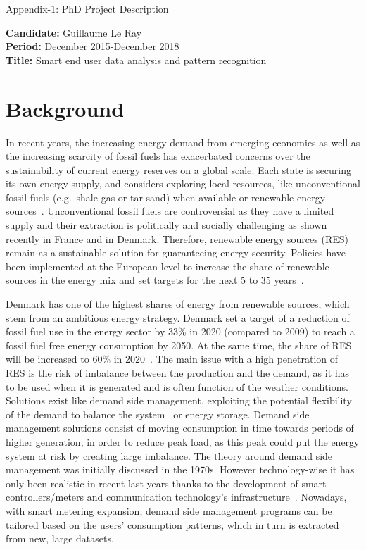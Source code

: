 \documentclass[fleqn,a4paper,twoside,10pt]{article}
\begin{document}
\begin{center}
\LARGE{Appendix-1: PhD Project Description}
\end{center}
\normalsize
\vspace{1cm}
{\bf Candidate:} Guillaume Le Ray\\
{\bf Period:} December 2015-December 2018\\
{\bf Title:} Smart end user data analysis and pattern recognition
\section{Background}
	In recent years, the increasing energy demand from emerging economies as well as the increasing scarcity of fossil fuels has exacerbated concerns over the sustainability of current energy reserves on a global scale. Each state is securing its own energy supply, and considers exploring local resources, like unconventional fossil fuels (e.g.\ shale gas or tar sand) when available or renewable energy sources~\cite{ramchurn2012}. Unconventional fossil fuels are controversial as they have a limited supply and their extraction is politically and socially challenging as shown recently in France and in Denmark. Therefore, renewable energy sources (RES) remain as a sustainable solution for guaranteeing energy security. Policies have been implemented at the European level to increase the share of renewable sources in the energy mix and set targets for the next 5 to 35 years~\cite{2020}.

	Denmark has one of the highest shares of energy from renewable sources, which stem from an ambitious energy strategy. Denmark set a target of a reduction of fossil fuel use in the energy sector by 33\% in 2020 (compared to 2009) to reach a fossil fuel free energy consumption by 2050. At the same time, the share of RES will be increased to 60\% in 2020~\cite{2020DK}. The main issue with a high penetration of RES is the risk of imbalance between the production and the demand, as it has to be used when it is generated and is often function of the weather conditions. Solutions exist like demand side management, exploiting the potential flexibility of the demand to balance the system~\cite{Albadi2008} or energy storage. Demand side management solutions consist of moving consumption in time towards periods of higher generation, in order to reduce peak load, as this peak could put the energy system at risk by creating large imbalance. The theory around demand side management was initially discussed in the 1970s. However technology-wise it has only been realistic in recent last years thanks to the development of smart controllers/meters and communication technology's infrastructure~\cite{Strbac2008}. Nowadays, with smart metering expansion, demand side management programs can be tailored based on the users' consumption patterns, which in turn is extracted from new, large datasets.
\end{document}
